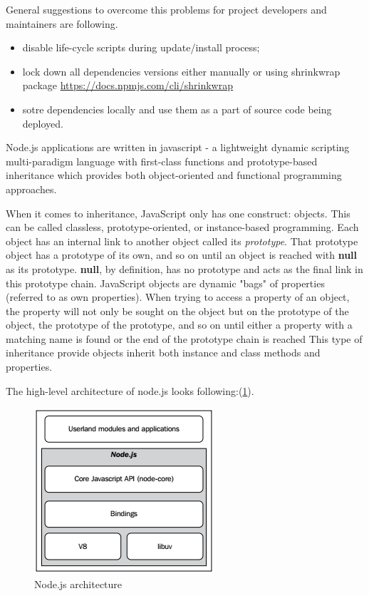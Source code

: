 General suggestions to overcome this problems for project developers and maintainers are following.
\begin{itemize}
	\item disable life-cycle scripts during update/install process;
	\item lock down all dependencies versions either manually or using shrinkwrap package \url{https://docs.npmjs.com/cli/shrinkwrap}
	\item sotre dependencies locally and use them as a part of source code being deployed.
\end{itemize}


Node.js applications are written in javascript - a lightweight dynamic scripting multi-paradigm language with first-class functions and prototype-based inheritance which provides both object-oriented and functional programming approaches\cite{mdnJS}.

When it comes to inheritance, JavaScript only has one construct: objects\cite{mdnProto}.
This can be called classless, prototype-oriented, or instance-based programming\cite{mdnOOP}. Each object has an internal link to another object called its \textit{prototype}. That prototype object has a prototype of its own, and so on until an object is reached with \textbf{null} as its prototype. \textbf{null}, by definition, has no prototype and acts as the final link in this prototype chain. JavaScript objects are dynamic "bags" of properties (referred to as own properties). When trying to access a property of an object, the property will not only be sought on the object but on the prototype of the object, the prototype of the prototype, and so on until either a property with a matching name is found or the end of the prototype chain is reached\cite{mdnProto} This type of inheritance provide objects inherit both instance and class methods and properties.

 
The high-level architecture of node.js looks following:(\ref{fig:nodeArch}). 
\begin{figure}[ht]
  	\label{fig:nodeArch}
    \centering
    \includegraphics[scale=1.0]{grafiken/nodeArchitecture.png}
     \caption{Node.js architecture \cite{nodejsbook}}
  \end{figure}

